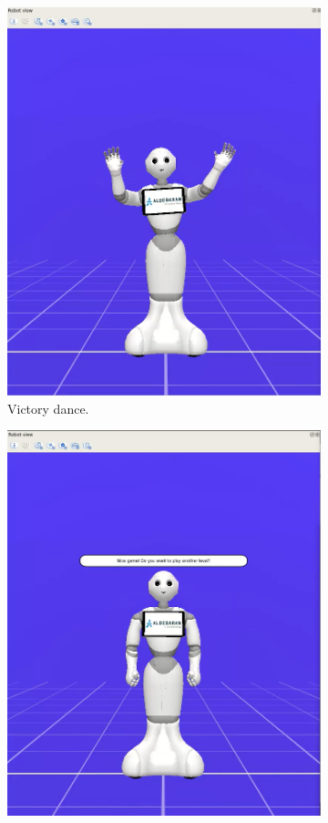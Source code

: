 \documentclass{article}
\begin{document}
\begin{figure}[H]
\begin{subfigure}{.33\textwidth}
      \includegraphics[width=0.9\linewidth]{images/144_vittoria.png}
      \caption{Victory dance.}
    \end{subfigure}%
    \begin{subfigure}{.33\textwidth}
      \centering
      \includegraphics[width=0.9\linewidth]{images/15_vuoi giocare di nuovo.png}

\end{subfigure}
\end{figure}
\end{document}
